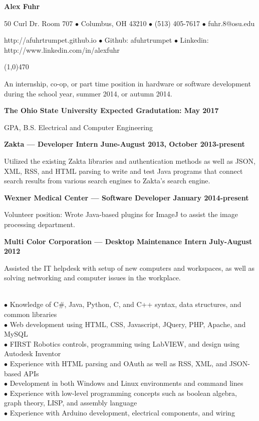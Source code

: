 \documentclass[10pt]{article}
\begin{document}
\centerline{{\LARGE \bf Alex Fuhr}}

\centerline{50 Curl Dr. Room 707 $\bullet$ Columbus, OH 43210 $\bullet$ (513) 405-7617 $\bullet$ fuhr.8@osu.edu}
\centerline{http://afuhrtrumpet.github.io $\bullet$ Github: afuhrtrumpet $\bullet$ Linkedin: http://www.linkedin.com/in/alexfuhr}
\noindent
\line(1,0){470}\\

\smallskip

\noindent
An internship, co-op, or part time position in hardware or software development during the school year, summer 2014, or autumn 2014.
\medskip

\smallskip

\centerline{{\large \bf The Ohio State University \hfill Expected Gradutation: May 2017}}
 GPA, B.S. Electrical and Computer Engineering
\medskip

\smallskip

\centerline{{\large \bf Zakta --- Developer Intern \hfill June-August 2013, October 2013-present}}
\noindent
Utilized the existing Zakta libraries and authentication methods as well as JSON, XML, RSS, and HTML parsing to write and test Java programs that connect search results from various search engines to Zakta's search engine.

\centerline{{\large \bf Wexner Medical Center --- Software Developer \hfill January 2014-present}}
\noindent
Volunteer position: Wrote Java-based plugins for ImageJ to assist the image processing department.

\centerline{{\large \bf Multi Color Corporation --- Desktop Maintenance Intern \hfill July-August 2012}}
\noindent
Assisted the IT helpdesk with setup of new computers and workspaces, as well as solving networking and computer issues in the workplace.
\medskip

\\
\smallskip
$\bullet$ Knowledge of C\#, Java, Python, C, and C++ syntax, data structures, and common libraries\\
$\bullet$ Web development using HTML, CSS, Javascript, JQuery, PHP, Apache, and MySQL\\
$\bullet$ FIRST Robotics controls, programming using LabVIEW, and design using Autodesk Inventor\\
$\bullet$ Experience with HTML parsing and OAuth as well as RSS, XML, and JSON-based APIs\\
$\bullet$ Development in both Windows and Linux environments and command lines\\
$\bullet$ Experience with low-level programming concepts such as boolean algebra, graph theory, LISP, and assembly language\\
$\bullet$ Experience with Arduino development, electrical components, and wiring
\medskip
\end{document}

